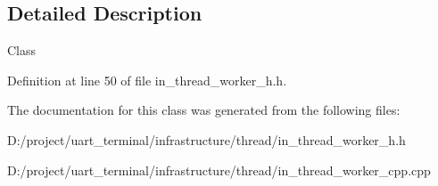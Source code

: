 \subsection{Detailed Description}
Class 

Definition at line 50 of file in\+\_\+thread\+\_\+worker\+\_\+h.\+h.



The documentation for this class was generated from the following files\+:\begin{DoxyCompactItemize}
\item 
D\+:/project/uart\+\_\+terminal/infrastructure/thread/in\+\_\+thread\+\_\+worker\+\_\+h.\+h\item 
D\+:/project/uart\+\_\+terminal/infrastructure/thread/in\+\_\+thread\+\_\+worker\+\_\+cpp.\+cpp\end{DoxyCompactItemize}
